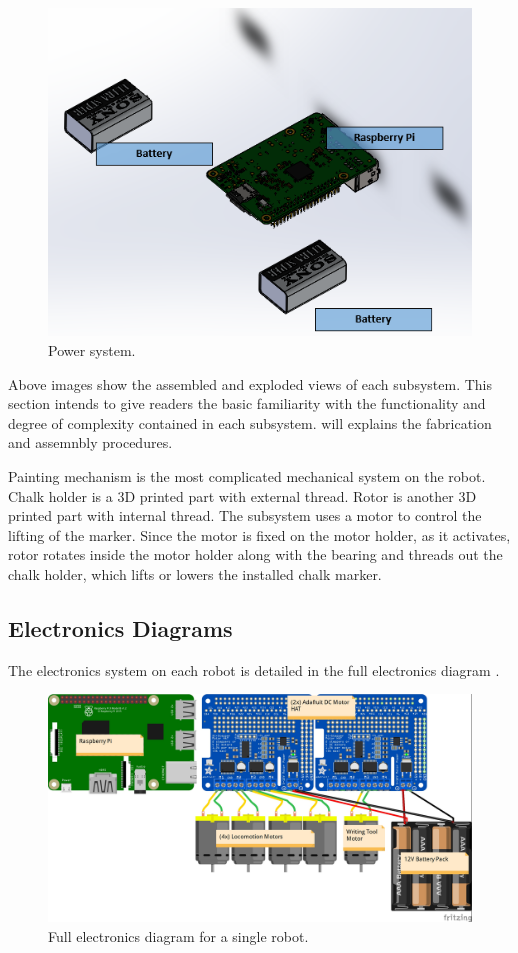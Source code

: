 \begin{figure}[h!]
\centering
\includegraphics[width=0.6\columnwidth]{hardware/CAD/PowerSystem/Power.PNG}
\caption{Power system.}
\label{fig:power-diagram}
\end{figure}

Above images show the assembled and exploded views of each subsystem. This section intends to give readers the basic familiarity with the functionality and degree of complexity contained in each subsystem.  will explains the fabrication and assemnbly procedures.

Painting mechanism is the most complicated mechanical system on the robot. Chalk holder is a 3D printed part with external thread. Rotor is another 3D printed part with internal thread. The subsystem uses a motor to control the lifting of the marker. Since the motor is fixed on the motor holder, as it activates, rotor rotates inside the motor holder along with the bearing and threads out the chalk holder, which lifts or lowers the installed chalk marker.

\clearpage

\subsection{Electronics Diagrams}
\label{sec:electronics_diagrams}

The electronics system on each robot is detailed in the full electronics diagram . 

\begin{figure}
\centering
\includegraphics[width=0.9\columnwidth]{figs/wiring-diagram.jpg}
\caption{Full electronics diagram for a single robot.}
\label{fig:electronics-diagram}
\end{figure}


